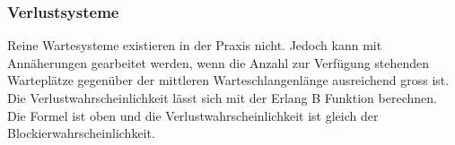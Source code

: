 \subsubsection{Verlustsysteme}

Reine Wartesysteme existieren in der Praxis nicht. Jedoch kann mit Annäherungen gearbeitet werden, wenn die Anzahl zur Verfügung stehenden Warteplätze gegenüber der mittleren Warteschlangenlänge ausreichend gross ist. \\

Die Verlustwahrscheinlichkeit lässt sich mit der Erlang B Funktion berechnen. Die Formel ist oben und die Verlustwahrscheinlichkeit ist gleich der Blockierwahrscheinlichkeit.


\newpage